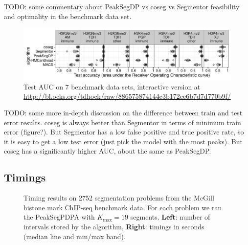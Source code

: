 \documentclass{article}
\begin{document}
TODO: some commentary about PeakSegDP vs coseg vs Segmentor
feasibility and optimality in the benchmark data set.

\begin{figure}[b!]
  \centering
  \includegraphics[width=\textwidth]{figure-test-error-dots}
  \caption{Test AUC on 7 benchmark data sets, interactive version at 
\url{http://bl.ocks.org/tdhock/raw/886575874144c3b172ce6b7d7d770b9f/}}
  \label{fig:test-error-dots}
\end{figure}

TODO: some more in-depth discussion on the difference between train
and test error results. coseg is always better than Segmentor in terms
of minimum train error (figure?). But Segmentor has a low false
positive and true positive rate, so it is easy to get a low test error
(just pick the model with the most peaks). But coseg has a
significantly higher AUC, about the same as PeakSegDP.

\subsection{Timings}

\begin{figure}[b!]
  \centering
  \parbox{0.49\textwidth}{
    
  }
  \parbox{0.49\textwidth}{
    
  }
  \caption{Timing results on 2752 segmentation problems from the
    McGill histone mark ChIP-seq benchmark data. For each problem we
    ran the PeakSegPDPA with $K_{\text{max}}=19$ segments.
    \textbf{Left}: number of intervals stored by the algorithm,
    \textbf{Right}: timings in seconds (median line and min/max
    band).}
  \label{fig:timings}
\end{figure}



\end{document}
